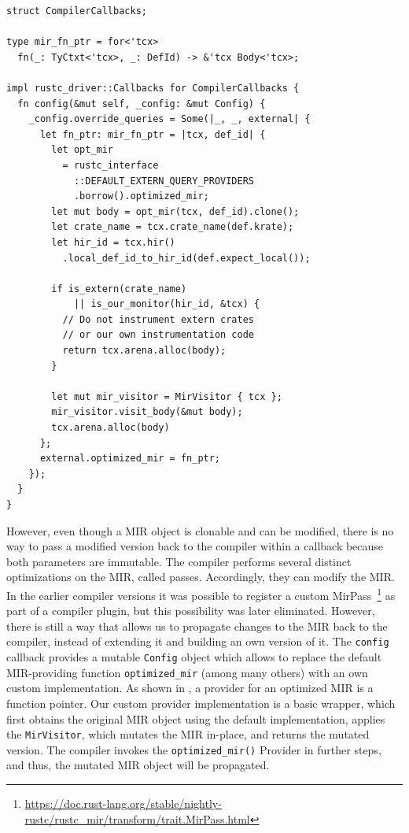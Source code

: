 \documentclass[paper=a4,%
  twoside,%
  BCOR4mm,%
  abstract=true,%
  toc=bibliography,%
  chapterprefix=true,%
  toc=bibliographynumbered,%
  open=right,%
  english,%
  pagesize=pdftex]{scrreprt}
\newcommand{\mir}{\ac{MIR}\xspace}
\begin{document}
\begin{lstlisting}[style=boxed, caption={The Rust compiler interface accepts an object which implements its callback trait, allowing us to execute code at different compilation phases}, label=lst:compiler-callbacks]
struct CompilerCallbacks;

type mir_fn_ptr = for<'tcx>
  fn(_: TyCtxt<'tcx>, _: DefId) -> &'tcx Body<'tcx>;

impl rustc_driver::Callbacks for CompilerCallbacks {
  fn config(&mut self, _config: &mut Config) {
    _config.override_queries = Some(|_, _, external| {
      let fn_ptr: mir_fn_ptr = |tcx, def_id| {
        let opt_mir
          = rustc_interface
            ::DEFAULT_EXTERN_QUERY_PROVIDERS
            .borrow().optimized_mir;
        let mut body = opt_mir(tcx, def_id).clone();
        let crate_name = tcx.crate_name(def.krate);
        let hir_id = tcx.hir()
          .local_def_id_to_hir_id(def.expect_local());

        if is_extern(crate_name)
            || is_our_monitor(hir_id, &tcx) {
          // Do not instrument extern crates
          // or our own instrumentation code
          return tcx.arena.alloc(body);
        }

        let mut mir_visitor = MirVisitor { tcx };
        mir_visitor.visit_body(&mut body);
        tcx.arena.alloc(body)
      };
      external.optimized_mir = fn_ptr;
    });
  }
}
\end{lstlisting}
However, even though a \mir object is clonable and can be modified, there is no way to pass a modified version back to the compiler within a callback because both parameters are immutable. The compiler performs several distinct optimizations on the \mir, called passes. Accordingly, they can modify the \mir. In the earlier compiler versions it was possible to register a custom MirPass~\footnote{\url{https://doc.rust-lang.org/stable/nightly-rustc/rustc_mir/transform/trait.MirPass.html}} as part of a compiler plugin, but this possibility was later eliminated. However, there is still a way that allows us to propagate changes to the \mir back to the compiler, instead of extending it and building an own version of it. The \texttt{config} callback provides a mutable \texttt{Config} object which allows to replace the default \mir-providing function \texttt{optimized\string_mir} (among many others) with an own custom implementation. As shown in , a provider for an optimized \mir is a function pointer. Our custom provider implementation is a basic wrapper, which first obtains the original \mir object using the default implementation, applies the \texttt{MirVisitor}, which mutates the \mir in-place, and returns the mutated version. The compiler invokes the \texttt{optimized\string_mir()} Provider in further steps, and thus, the mutated \mir object will be propagated.
\end{document}
